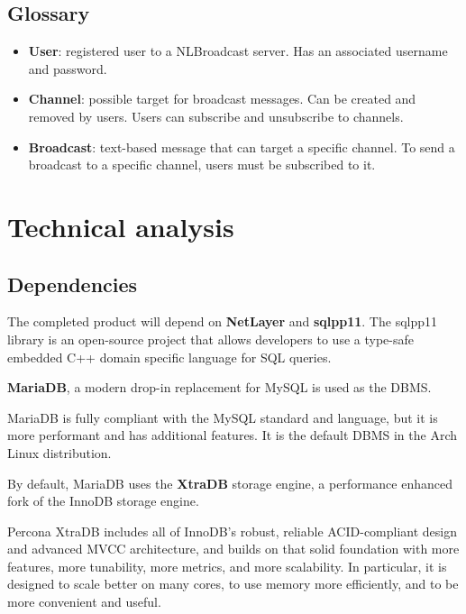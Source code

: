 \documentclass[11pt]{report}
\newcommand{\+}{\discretionary{\mbox{\scriptsize$\hookleftarrow$}}{}{}}
\renewcommand\emph{\textbf}
\begin{document}
        \section{Glossary}

            \begin{itemize}
                \item \emph{User}: registered user to a NLBroadcast server. Has an associated username and password.
                \item \emph{Channel}: possible target for broadcast messages. Can be created and removed by users. Users can subscribe and unsubscribe to channels.
                \item \emph{Broadcast}: text-based message that can target a specific channel. To send a broadcast to a specific channel, users must be subscribed to it.
            \end{itemize}

    \chapter{Technical analysis}

        \section{Dependencies}

            The completed product will depend on \emph{NetLayer} and \emph{sqlpp11}. The sqlpp11 library is an open-source project that allows developers to use a type-safe embedded C++ domain specific language for SQL queries.

            \emph{MariaDB}, a modern drop-in replacement for MySQL is used as the DBMS. 

            MariaDB is fully compliant with the MySQL standard and language, but it is more performant and has additional features. It is the default DBMS in the Arch Linux distribution.

            By default, MariaDB uses the \emph{XtraDB} storage engine, a performance enhanced fork of the InnoDB storage engine.

            Percona XtraDB includes all of InnoDB's robust, reliable ACID-compliant design and advanced MVCC architecture, and builds on that solid foundation with more features, more tunability, more metrics, and more scalability. In particular, it is designed to scale better on many cores, to use memory more efficiently, and to be more convenient and useful. 
\end{document}
